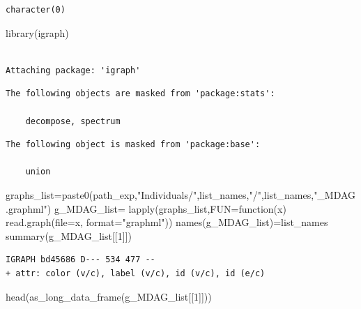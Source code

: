 \documentclass[
  letterpaper,
  DIV=11,
  numbers=noendperiod]{scrreprt}
\newenvironment{Shaded}{\begin{snugshade}}{\end{snugshade}}
\newcommand{\AttributeTok}[1]{\textcolor[rgb]{0.40,0.45,0.13}{#1}}
\newcommand{\ControlFlowTok}[1]{\textcolor[rgb]{0.00,0.23,0.31}{#1}}
\newcommand{\DecValTok}[1]{\textcolor[rgb]{0.68,0.00,0.00}{#1}}
\newcommand{\FunctionTok}[1]{\textcolor[rgb]{0.28,0.35,0.67}{#1}}
\newcommand{\NormalTok}[1]{\textcolor[rgb]{0.00,0.23,0.31}{#1}}
\newcommand{\OtherTok}[1]{\textcolor[rgb]{0.00,0.23,0.31}{#1}}
\newcommand{\StringTok}[1]{\textcolor[rgb]{0.13,0.47,0.30}{#1}}
\begin{document}
\begin{verbatim}
character(0)
\end{verbatim}

\begin{Shaded}
\begin{Highlighting}[]
\FunctionTok{library}\NormalTok{(igraph)}
\end{Highlighting}
\end{Shaded}

\begin{verbatim}

Attaching package: 'igraph'
\end{verbatim}

\begin{verbatim}
The following objects are masked from 'package:stats':

    decompose, spectrum
\end{verbatim}

\begin{verbatim}
The following object is masked from 'package:base':

    union
\end{verbatim}

\begin{Shaded}
\begin{Highlighting}[]
\NormalTok{graphs\_list}\OtherTok{=}\FunctionTok{paste0}\NormalTok{(path\_exp,}\StringTok{"Individuals/"}\NormalTok{,list\_names,}\StringTok{"/"}\NormalTok{,list\_names,}\StringTok{"\_MDAG.graphml"}\NormalTok{)}
\NormalTok{g\_MDAG\_list}\OtherTok{=}
  \FunctionTok{lapply}\NormalTok{(graphs\_list,}\AttributeTok{FUN=}\ControlFlowTok{function}\NormalTok{(x) }\FunctionTok{read.graph}\NormalTok{(}\AttributeTok{file=}\NormalTok{x,}
                    \AttributeTok{format=}\StringTok{"graphml"}\NormalTok{))}
\FunctionTok{names}\NormalTok{(g\_MDAG\_list)}\OtherTok{=}\NormalTok{list\_names}
\FunctionTok{summary}\NormalTok{(g\_MDAG\_list[[}\DecValTok{1}\NormalTok{]])}
\end{Highlighting}
\end{Shaded}

\begin{verbatim}
IGRAPH bd45686 D--- 534 477 -- 
+ attr: color (v/c), label (v/c), id (v/c), id (e/c)
\end{verbatim}

\begin{Shaded}
\begin{Highlighting}[]
\FunctionTok{head}\NormalTok{(}\FunctionTok{as\_long\_data\_frame}\NormalTok{(g\_MDAG\_list[[}\DecValTok{1}\NormalTok{]]))}
\end{Highlighting}
\end{Shaded}
\end{document}
